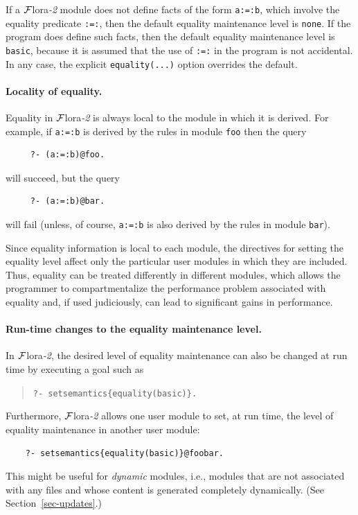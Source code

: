 \documentclass[11pt]{article}
\newcommand{\FLORA}{{\mbox{\sc ${\cal F}${lora}\rm\emph{-2}}}\xspace}
\begin{document}
If a \FLORA module does not define facts of the form {\tt a:=:b}, which
involve the equality predicate {\tt :=:}, then the default equality
maintenance level is {\tt none}. If the program does define such facts,
then the default equality maintenance level is {\tt basic}, because it is
assumed that the use of {\tt :=:} in the program is not accidental.
In any case, the explicit {\tt equality(...)} option overrides the default.

\paragraph{Locality of equality.}
Equality in \FLORA is always local to the module in which it is derived.
For example, if {\tt a:=:b} is derived by the rules in module {\tt foo}
then the query
\begin{verbatim}
     ?- (a:=:b)@foo.  
\end{verbatim}
will succeed, but the query
\begin{verbatim}
     ?- (a:=:b)@bar.  
\end{verbatim}
will fail (unless, of course, {\tt a:=:b} is also derived by the rules in
module {\tt bar}).

Since equality information is local to each module, the directives for
setting the equality level affect only the particular user modules in which
they are included.  Thus, equality can be treated differently in different
modules, which allows the programmer to compartmentalize the performance
problem associated with equality and, if used judiciously, can lead to
significant gains in performance.

\paragraph{Run-time changes to the equality maintenance level.}
In \FLORA, the desired level of equality maintenance can also be changed at
run time by executing a goal such as
\begin{quote}
 {\tt ?- setsemantics\{equality(basic)\}.}
\end{quote}
Furthermore, \FLORA allows one user module to set, at run time, the level
of equality maintenance in another user module:
\begin{verbatim}
    ?- setsemantics{equality(basic)}@foobar.
\end{verbatim}
This might be useful for \emph{dynamic} modules, i.e., modules that
are not associated with any files and whose content is generated completely
dynamically. (See Section~\ref{sec-updates}.)
\end{document}

